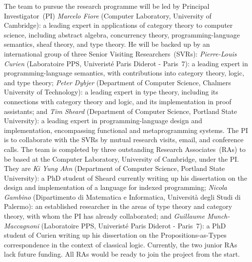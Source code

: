 \documentclass[11pt,twocolumn]{article}
\newenvironment{myitemize}
  {\begin{list}{$\bullet$}
  {\setlength{\topsep}{1pt}
   \setlength{\partopsep}{1pt}
   \setlength{\itemsep}{0pt}
   \setlength{\parsep}{0pt}
   \setlength{\leftmargin}{1em}
   \setlength{\labelwidth}{.5em}}}
  {\end{list}}
\begin{document}
The team to pursue the research programme will be led by 
    Principal Investigator~(PI) \emph{Marcelo Fiore} 
    (Computer Laboratory, University of Cambridge): 
    a %
    leading expert in applications of category theory to computer science,
    including abstract algebra, concurrency theory, programming-language
    semantics, sheaf theory, and type theory.  
%
He will be 
backed up %
by an international group of three Senior Visiting Researchers~(SVRs):
  \emph{Pierre-Louis Curien} 
  (Laboratoire PPS, Univerist\'e Paris Diderot - Paris~7): 
  a %
  leading expert in programming-language semantics, with contributions
  into category theory, logic, %
  and type theory; 
  \emph{Peter Dybjer} 
  (Department of Computer Science, Chalmers University of Technology): 
  a %
  leading expert in type theory, including its connections with category
  theory and logic, and its implementation in proof assistants; and 
  \emph{Tim Sheard} 
  (Department of Computer Science, Portland State University): 
  a %
  leading expert in pro\-gram\-ming-language design and implementation,
  encompassing functional and metaprogramming systems. 
%
The PI is to collaborate with the SVRs by mutual research visits, email, and
conference calls.
%
The team is completed by three outstanding Research Associates~(RAs) to be
based at the Computer Laboratory, University of Cambridge, under the PI.  They
are
  \emph{Ki Yung Ahn}
  (Department of Computer Science, Portland State University): 
  a PhD student of %
  Sheard currently writing up his dissertation on the design and
  implementation of a language for indexed programming;
  \emph{Nicola Gambino}
  (Dipartimento di Matematica e Informatica, Universit\`a degli Studi di
  Palermo):  
  an established researcher in the areas of type theory and category theory,
  with whom the PI has already collaborated; and 
  \emph{Guillaume Munch-Maccagnoni}
  (Laboratoire PPS, Univerist\'e Paris Diderot - Paris~7): 
  a PhD student of %
  Curien writing up his dissertation on the Propositions-as-Types
  correspondence in the context of classical logic.
Currently, the two junior RAs lack future funding.  All RAs would be ready
to join the project from the start.
\end{document}
